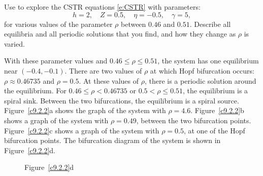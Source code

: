 \documentclass{ximera}
\begin{document}
\begin{computerExercise} \label{c9.2.2}
Use {\pplane} to explore the CSTR equations \eqref{e:CSTR} with
parameters:
\[
h=2, \quad Z=0.5, \quad \eta=-0.5, \quad \gamma=5,
\]
for various values of the parameter $\rho$ between $0.46$ and 
$0.51$.  Describe all equilibria and all periodic solutions that 
you find, and how they change as $\rho$ is varied.

\begin{solution}

With these parameter values and $0.46 \leq \rho \leq 0.51$, the system
has one equilibrium near $(-0.4,-0.1)$.  There are two values of $\rho$
at which Hopf bifurcation occurs: $\rho \approx 0.46735$ and
$\rho = 0.5$.  At these values of $\rho$, there is a periodic solution
around the equilibrium.  For $0.46 \leq \rho < 0.46735$ or $0.5 < \rho
\leq 0.51$, the equilibrium is a spiral sink.  Between the two
bifurcations, the equilibrium is a spiral source.  Figure~\ref{c9.2.2}a
shows the {\pplane} graph of the system with $\rho = 4.6$. 
Figure~\ref{c9.2.2}b shows a graph of the system with $\rho = 0.49$,
between the two bifurcation points.  Figure~\ref{c9.2.2}c shows a graph
of the system with $\rho = 0.5$, at one of the Hopf bifurcation points.
The bifurcation diagram of the system is shown in Figure~\ref{c9.2.2}d.

\begin{figure}[htb]
                       \centerline{%
                       }
\end{figure}

\begin{figure}[htb]
			\centerline{%
			}
		\centerline{Figure~\ref{c9.2.2}d}
\end{figure}




\end{solution}
\end{computerExercise}
\end{document}
